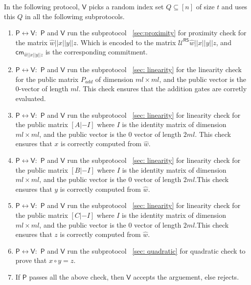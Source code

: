 \documentclass[runningheads]{llncs}
\def\prover{\mathsf{P}}
\def\verifier{\mathsf{V}}
\def\RS{\mathsf{RS}} %
\def\cm{\mathsf{cm}} %
\def\extwit{\hat{w}} %
\def\oracle{\mathcal{U}^{\RS}}
\begin{document}
	In the following protocol, $\verifier$ picks a random index set $Q\subseteq [n]$ of size $t$ and uses this $Q$ in all the followimg subprotocols.
	\begin{enumerate}
		\item $\prover \leftrightarrow \verifier: $ $\prover$ and $\verifier$ run the subprotocol ~\ref{sec:proximity} for proximity check for the matrix $\extwit||x||y||z$. Which is encoded to the matrix $\oracle{\extwit||x||y||z}$, and $\cm_{\extwit||x||y||z}$ is the corresponding commitment.
		
		\item $\prover \leftrightarrow \verifier: $ $\prover$ and $\verifier$ run the subprotocol ~\ref{sec: linearity} for the linearity check for the public matrix $P_{add}$ of dimension $ml\times ml$, and the public vector is the 0-vector of length $ml$. This check ensures that the addition gates are corretly evaluated.
		
		\item $\prover \leftrightarrow \verifier:$ $\prover$ and $\verifier$ run the subprotocol ~\ref{sec: linearity} for linearity check for the public matrix $[A|-I]$ where $I$ is the identity matrix of dimension $ml \times ml$, and the public vector is the 0 vector of length $2ml$. This check ensures that $x$ is correctly computed from $\extwit$.
		
		\item $\prover \leftrightarrow \verifier:$ $\prover$ and $\verifier$ run the subprotocol ~\ref{sec: linearity} for linearity check for the public matrix $[B|-I]$ where $I$ is the identity matrix of dimension $ml \times ml$, and the public vector is the 0 vector of length $2ml$.This check ensures that $y$ is correctly computed from $\extwit$.
		
		\item $\prover \leftrightarrow \verifier:$ $\prover$ and $\verifier$ run the subprotocol ~\ref{sec: linearity} for linearity check for the public matrix $[C|-I]$ where $I$ is the identity matrix of dimension $ml \times ml$, and the public vector is the 0 vector of length $2ml$.This check ensures that $z$ is correctly computed from $\extwit$.
		
		\item $\prover \leftrightarrow \verifier:$ $\prover$ and $\verifier$ run the subprotocol ~\ref{sec: quadratic} for quadratic check to prove that $x \circ y = z$.
		
		\item If $\prover$ passes all the above check, then $\verifier$ accepts the arguement, else rejects.
	\end{enumerate}
	
\end{document}
